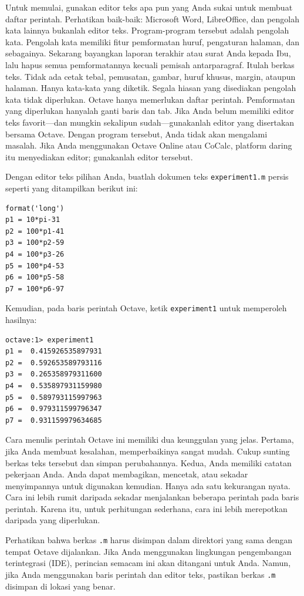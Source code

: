 Untuk memulai, gunakan editor teks apa pun yang Anda sukai untuk membuat
daftar perintah. Perhatikan baik-baik: Microsoft Word, LibreOffice,
dan pengolah kata lainnya bukanlah editor teks. Program-program tersebut
adalah pengolah kata. Pengolah kata memiliki fitur pemformatan huruf,
pengaturan halaman, dan sebagainya. Sekarang bayangkan laporan terakhir
atau surat Anda kepada Ibu, lalu hapus semua pemformatannya kecuali
pemisah antarparagraf. Itulah berkas teks. Tidak ada cetak tebal,
pemusatan, gambar, huruf khusus, margin, ataupun halaman. Hanya kata-kata
yang diketik. Segala hiasan yang disediakan pengolah kata tidak diperlukan.
Octave hanya memerlukan daftar perintah. Pemformatan yang diperlukan
hanyalah ganti baris dan tab. Jika Anda belum memiliki editor teks
favorit---dan mungkin sekalipun sudah---gunakanlah editor yang disertakan
bersama Octave. Dengan program tersebut, Anda tidak akan mengalami
masalah. Jika Anda menggunakan Octave Online atau CoCalc, platform
daring itu menyediakan editor; gunakanlah editor tersebut. 

Dengan editor teks pilihan Anda, buatlah dokumen teks \texttt{experiment1.m}
persis seperti yang ditampilkan berikut ini: \begin{verbatim}
format('long')
p1 = 10*pi-31
p2 = 100*p1-41
p3 = 100*p2-59
p4 = 100*p3-26
p5 = 100*p4-53
p6 = 100*p5-58
p7 = 100*p6-97 
\end{verbatim} Kemudian, pada baris perintah Octave, ketik \texttt{experiment1}
untuk memperoleh hasilnya: \begin{verbatim}
octave:1> experiment1
p1 =  0.415926535897931
p2 =  0.592653589793116
p3 =  0.265358979311600
p4 =  0.535897931159980
p5 =  0.589793115997963
p6 =  0.979311599796347
p7 =  0.931159979634685
\end{verbatim} Cara menulis perintah Octave ini memiliki dua keunggulan yang jelas.
Pertama, jika Anda membuat kesalahan, memperbaikinya sangat mudah.
Cukup sunting berkas teks tersebut dan simpan perubahannya. Kedua,
Anda memiliki catatan pekerjaan Anda. Anda dapat membagikan, mencetak,
atau sekadar menyimpannya untuk digunakan kemudian. Hanya ada satu
kekurangan nyata. Cara ini lebih rumit daripada sekadar menjalankan
beberapa perintah pada baris perintah. Karena itu, untuk perhitungan
sederhana, cara ini lebih merepotkan daripada yang diperlukan.

Perhatikan bahwa berkas \texttt{.m} harus disimpan dalam direktori
yang sama dengan tempat Octave dijalankan. Jika Anda menggunakan lingkungan
pengembangan terintegrasi (IDE), perincian semacam ini akan ditangani
untuk Anda. Namun, jika Anda menggunakan baris perintah dan editor
teks, pastikan berkas \texttt{.m} disimpan di lokasi yang benar.

